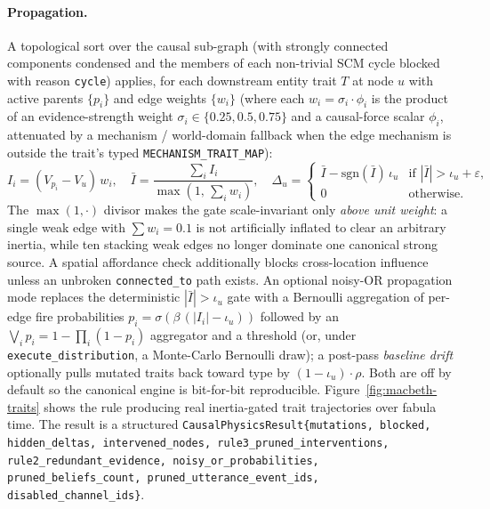 \documentclass[11pt]{article}
\begin{document}
\paragraph{Propagation.} A topological sort over the causal
sub-graph (with strongly connected components condensed and the
members of each non-trivial SCM cycle blocked with reason
\texttt{cycle}) applies, for each downstream entity trait $T$ at
node $u$ with active parents $\{p_i\}$ and edge weights
$\{w_i\}$ (where each $w_i = \sigma_i \cdot \phi_i$ is the
product of an evidence-strength weight $\sigma_i \in \{0.25,
0.5, 0.75\}$ and a causal-force scalar $\phi_i$, attenuated by a
mechanism / world-domain fallback when the edge mechanism is
outside the trait's typed
\texttt{MECHANISM\_TRAIT\_MAP}):
\begin{equation}
\label{eq:impact}
I_i = (V_{p_i} - V_u)\, w_i,
\quad
\bar I = \frac{\sum_i I_i}{\max(1,\, \sum_i w_i)},
\quad
\Delta_u =
\begin{cases}
\bar I - \mathrm{sgn}(\bar I)\, \iota_u & \text{if } |\bar I| > \iota_u + \varepsilon,\\
0 & \text{otherwise.}
\end{cases}
\end{equation}
The $\max(1, \cdot)$ divisor makes the gate scale-invariant only
\emph{above unit weight}: a single weak edge with
$\sum w_i = 0.1$ is not artificially inflated to clear an
arbitrary inertia, while ten stacking weak edges no longer
dominate one canonical strong source. A spatial affordance check
additionally blocks cross-location influence unless an unbroken
\texttt{connected\_to} path exists. An optional noisy-OR
propagation mode replaces the deterministic
$|\bar I| > \iota_u$ gate with a Bernoulli aggregation of
per-edge fire probabilities
$p_i = \sigma(\beta\,(|I_i| - \iota_u))$ followed by an
$\bigvee_i p_i = 1 - \prod_i (1 - p_i)$ aggregator and a
threshold (or, under
\texttt{execute\_distribution}, a Monte-Carlo Bernoulli draw); a
post-pass \emph{baseline drift} optionally pulls mutated traits
back toward type by $(1 - \iota_u)\cdot \rho$. Both are off by
default so the canonical engine is bit-for-bit reproducible.
Figure~\ref{fig:macbeth-traits} shows the rule producing real
inertia-gated trait trajectories over fabula time. The
result is a structured
\texttt{CausalPhysicsResult\{mutations, blocked, hidden\_deltas,
intervened\_nodes, rule3\_pruned\_interventions,
rule2\_redundant\_evidence, noisy\_or\_probabilities,
pruned\_beliefs\_count, pruned\_utterance\_event\_ids,
disabled\_channel\_ids\}}.
\end{document}
